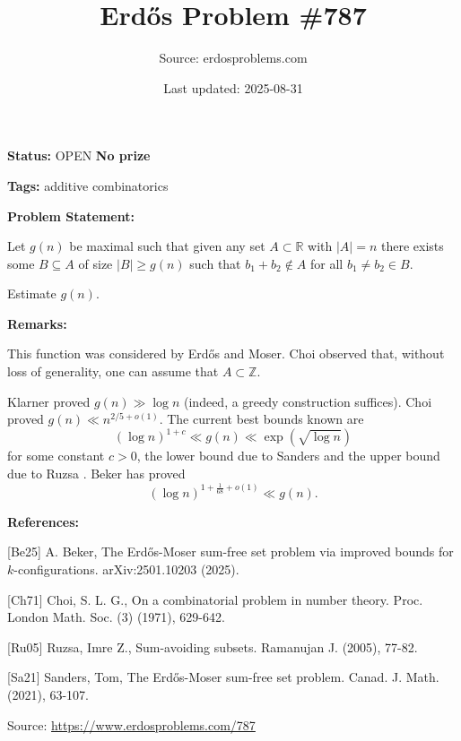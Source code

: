 \documentclass{article}
\title{Erd\H{o}s Problem \#787}
\date{Last updated: 2025-08-31}
\author{Source: erdosproblems.com}
\begin{document}
\maketitle

\noindent\textbf{Status:} OPEN \quad \textbf{No prize}

\noindent\textbf{Tags:} additive combinatorics

\medskip
\noindent\textbf{Problem Statement:}

Let $g(n)$ be maximal such that given any set $A\subset \mathbb{R}$ with $\lvert A\rvert=n$ there exists some $B\subseteq A$ of size $\lvert B\rvert\geq g(n)$ such that $b_1+b_2\not\in A$ for all $b_1\neq b_2\in B$.

Estimate $g(n)$.

\bigskip
\noindent\textbf{Remarks:}

This function was considered by Erd\H{o}s and Moser. Choi observed that, without loss of generality, one can assume that $A\subset \mathbb{Z}$.

Klarner proved $g(n) \gg \log n$ (indeed, a greedy construction suffices). Choi \cite{Ch71} proved $g(n) \ll n^{2/5+o(1)}$. The current best bounds known are\[(\log n)^{1+c} \ll g(n) \ll \exp(\sqrt{\log n})\]for some constant $c>0$, the lower bound due to Sanders \cite{Sa21} and the upper bound due to Ruzsa \cite{Ru05}. Beker \cite{Be25} has proved\[(\log n)^{1+\tfrac{1}{68}+o(1)} \ll g(n).\]

\bigskip
\noindent\textbf{References:}

[Be25] A. Beker, The Erd\H{o}s-Moser sum-free set problem via improved bounds for $k$-configurations. arXiv:2501.10203 (2025).
 
 [Ch71] Choi, S. L. G., On a combinatorial problem in number theory. Proc. London Math. Soc. (3) (1971), 629-642.
 
 [Ru05] Ruzsa, Imre Z., Sum-avoiding subsets. Ramanujan J. (2005), 77-82.
 
 [Sa21] Sanders, Tom, The Erd\H{o}s-Moser sum-free set problem. Canad. J. Math. (2021), 63-107.

\bigskip
\noindent\small{Source: \url{https://www.erdosproblems.com/787}}
\end{document}
